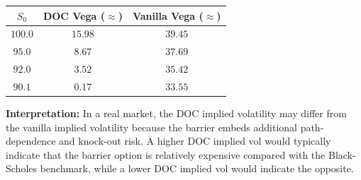\documentclass{report}
\begin{document}
\begin{center}
\begin{tabular}{ccc}
\toprule
$S_0$ & DOC Vega ($\approx$) & Vanilla Vega ($\approx$) \\
\midrule
$100.0$ & $15.98$ & $39.45$ \\
$95.0$ & $8.67$ & $37.69$ \\
$92.0$ & $3.52$ & $35.42$ \\
$90.1$ & $0.17$ & $33.55$ \\
\bottomrule
\end{tabular}
\end{center}

\textbf{Interpretation:} In a real market, the DOC implied volatility may differ from the vanilla implied volatility because the barrier embeds additional path-dependence and knock-out risk. A higher DOC implied vol would typically indicate that the barrier option is relatively expensive compared with the Black-Scholes benchmark, while a lower DOC implied vol would indicate the opposite.
\end{document}
